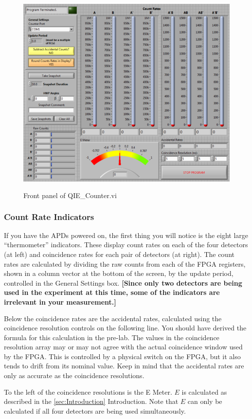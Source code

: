 \documentclass{../lab}
\begin{document}
\begin{figure}[h]
    \centering
    \href{http://experimentationlab.berkeley.edu/sites/default/files/images/600px-QIE_LabVIEW.png}{\includegraphics[width=0.5\linewidth]{images/600px-QIE_LabVIEW.png}}
    \caption{Front panel of QIE\_Counter.vi}
    \label{fig:600px-QIE_LabVIEW}
\end{figure}

\subsubsection{Count Rate Indicators}

If you have the APDs powered on, the first thing you will notice is the eight large ``thermometer'' indicators. These display count rates on each of the four detectors (at left) and coincidence rates for each pair of detectors (at right). The count rates are calculated by dividing the raw counts from each of the FPGA registers, shown in a column vector at the bottom of the screen, by the update period, controlled in the General Settings box. \textbf{[Since only two detectors are being used in the experiment at this time, some of the indicators are irrelevant in your measurement.]}

Below the coincidence rates are the accidental rates, calculated using the coincidence resolution controls on the following line. You should have derived the formula for this calculation in the pre-lab. The values in the coincidence resolution array may or may not agree with the actual coincidence window used by the FPGA. This is controlled by a physical switch on the FPGA, but it also tends to drift from its nominal value. Keep in mind that the accidental rates are only as accurate as the coincidence resolutions.

To the left of the coincidence resolutions is the E Meter. $E$ is calculated as described in the \ref{sec:Introduction} Introduction. Note that $E$ can only be calculated if all four detectors are being used simultaneously.
\end{document}
